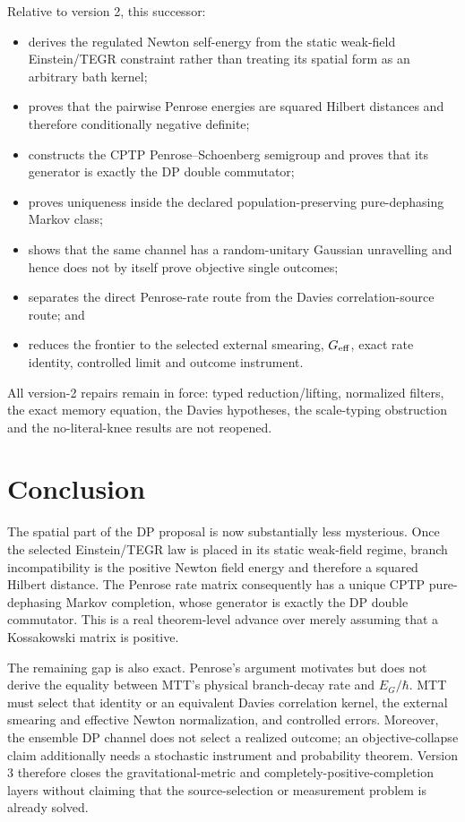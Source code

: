 \documentclass[11pt]{article}
\begin{document}
Relative to version 2, this successor:
\begin{itemize}
\item derives the regulated Newton self-energy from the static weak-field
Einstein/TEGR constraint rather than treating its spatial form as an arbitrary bath
kernel;
\item proves that the pairwise Penrose energies are squared Hilbert distances and
therefore conditionally negative definite;
\item constructs the CPTP Penrose--Schoenberg semigroup and proves that its generator
is exactly the DP double commutator;
\item proves uniqueness inside the declared population-preserving pure-dephasing
Markov class;
\item shows that the same channel has a random-unitary Gaussian unravelling and hence
does not by itself prove objective single outcomes;
\item separates the direct Penrose-rate route from the Davies correlation-source
route; and
\item reduces the frontier to the selected external smearing, $G_{\rm eff}$, exact
rate identity, controlled limit and outcome instrument.
\end{itemize}

All version-2 repairs remain in force: typed reduction/lifting, normalized filters,
the exact memory equation, the Davies hypotheses, the scale-typing obstruction and
the no-literal-knee results are not reopened.

\section{Conclusion}

The spatial part of the DP proposal is now substantially less mysterious. Once the
selected Einstein/TEGR law is placed in its static weak-field regime, branch
incompatibility is the positive Newton field energy and therefore a squared Hilbert
distance. The Penrose rate matrix consequently has a unique CPTP pure-dephasing
Markov completion, whose generator is exactly the DP double commutator. This is a
real theorem-level advance over merely assuming that a Kossakowski matrix is
positive.

The remaining gap is also exact. Penrose's argument motivates but does not derive
the equality between MTT's physical branch-decay rate and $E_G/\hbar$. MTT must select
that identity or an equivalent Davies correlation kernel, the external smearing and
effective Newton normalization, and controlled errors. Moreover, the ensemble DP
channel does not select a realized outcome; an objective-collapse claim additionally
needs a stochastic instrument and probability theorem. Version 3 therefore closes
the gravitational-metric and completely-positive-completion layers without claiming
that the source-selection or measurement problem is already solved.
\end{document}
